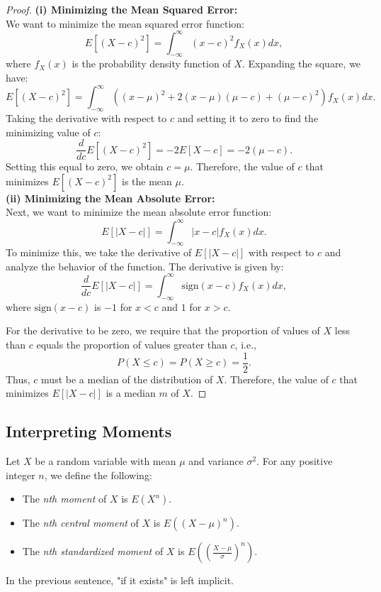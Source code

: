 \begin{proof}
    
\textbf{(i) Minimizing the Mean Squared Error:}\\

We want to minimize the mean squared error function:
\[
E[(X - c)^2] = \int_{-\infty}^{\infty} (x - c)^2 f_X(x) dx,
\]
where \( f_X(x) \) is the probability density function of \( X \). Expanding the square, we have:
\[
E[(X - c)^2] = \int_{-\infty}^{\infty} \left( (x - \mu)^2 + 2(x - \mu)(\mu - c) + (\mu - c)^2 \right) f_X(x) dx.
\]
Taking the derivative with respect to \( c \) and setting it to zero to find the minimizing value of \( c \):
\[
\frac{d}{dc} E[(X - c)^2] = -2 E[X - c] = -2 (\mu - c).
\]
Setting this equal to zero, we obtain \( c = \mu \). Therefore, the value of \( c \) that minimizes \( E[(X - c)^2] \) is the mean \( \mu \).\\

\textbf{(ii) Minimizing the Mean Absolute Error:}\\

Next, we want to minimize the mean absolute error function:
\[
E[|X - c|] = \int_{-\infty}^{\infty} |x - c| f_X(x) dx.
\]
To minimize this, we take the derivative of \( E[|X - c|] \) with respect to \( c \) and analyze the behavior of the function. The derivative is given by:
\[
\frac{d}{dc} E[|X - c|] = \int_{-\infty}^{\infty} \text{sign}(x - c) f_X(x) dx,
\]
where \( \text{sign}(x - c) \) is \( -1 \) for \( x < c \) and \( 1 \) for \( x > c \).

For the derivative to be zero, we require that the proportion of values of \( X \) less than \( c \) equals the proportion of values greater than \( c \), i.e.,
\[
P(X \leq c) = P(X \geq c) = \frac{1}{2}.
\]
Thus, \( c \) must be a median of the distribution of \( X \). Therefore, the value of \( c \) that minimizes \( E[|X - c|] \) is a median \( m \) of \( X \).
\end{proof}

\subsection{Interpreting Moments}

\begin{definition}
    Let \( X \) be a random variable with mean \( \mu \) and variance \( \sigma^2 \). For any positive integer \( n \), we define the following:

\begin{itemize}
    \item The \textit{nth moment} of \( X \) is \( E(X^n) \).
    \item The \textit{nth central moment} of \( X \) is \( E((X - \mu)^n) \).
    \item The \textit{nth standardized moment} of \( X \) is \( E\left( \left( \frac{X - \mu}{\sigma} \right)^n \right) \).
\end{itemize}

In the previous sentence, "if it exists" is left implicit.
\end{definition}


